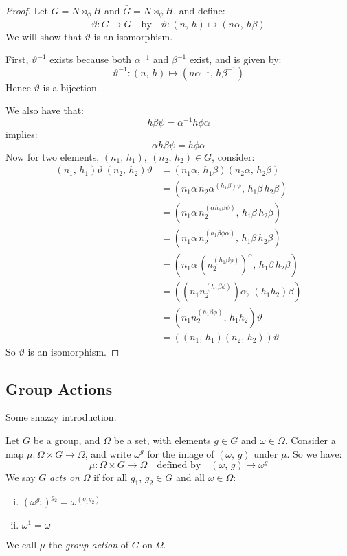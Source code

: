 \begin{proof}
    Let \(G = N \rtimes_\phi H\) and \(\bar{G} = N \rtimes_\psi H\), and define:
    \[\vartheta:G \to \bar{G} \quad \text{by} \quad \vartheta:(n,\,h) \mapsto (n\alpha,\,h\beta)\]
    We will show that \(\vartheta\) is an isomorphism.

    First, \(\vartheta^{-1}\) exists because both \(\alpha^{-1}\) and \(\beta^{-1}\) exist, and is given by:
    \[\vartheta^{-1}:(n,\,h) \mapsto (n\alpha^{-1},\,h\beta^{-1})\]
    Hence \(\vartheta\) is a bijection.

    We also have that:
    \[h\beta\psi = \alpha^{-1}h\phi\alpha\]
    implies:
    \[\alpha h\beta\psi = h\phi\alpha\]
    Now for two elements, \((n_1,\,h_1),\ (n_2,\,h_2) \in G\), consider:
    \begin{equation*}
    \begin{aligned}
        (n_1,\,h_1)\vartheta\ (n_2,\,h_2)\vartheta &= (n_1\alpha,\,h_1\beta)(n_2\alpha,\,h_2\beta) \\
        &= (n_1\alpha\,n_2\alpha^{(h_1\beta)\psi},\,h_1\beta\,h_2\beta) \\
        &= (n_1\alpha\,n_2^{(\alpha h_1\beta\psi)},\,h_1\beta\,h_2\beta) \\
        &= (n_1\alpha\,n_2^{(h_1\beta\phi\alpha)},\, h_1\beta\,h_2\beta) \\
        &= (n_1\alpha\,{(n_2^{(h_1\beta\phi)})}^\alpha,\, h_1\beta\,h_2\beta) \\
        &= ((n_1n_2^{(h_1\beta\phi)})\alpha,\, (h_1h_2)\beta) \\
        &= (n_1n_2^{(h_1\beta\phi)},\, h_1h_2)\vartheta \\
        &= ((n_1,\,h_1)(n_2,\,h_2))\vartheta
    \end{aligned}
    \end{equation*}
    So \(\vartheta\) is an isomorphism.
\end{proof}

\subsection{Group Actions}
Some snazzy introduction.

\begin{definition}
    Let \(G\) be a group, and \(\Omega\) be a set, with elements \(g \in G\) and \(\omega \in \Omega\).
    Consider a map \(\mu:\Omega \times G \to \Omega\), and write \(\omega^g\) for the image of \((\omega,\,g)\) under
    \(\mu\).
    So we have:
    \[\mu:\Omega \times G \to \Omega \quad \text{defined by} \quad (\omega,\,g) \mapsto \omega^g\]
    We say \(G\) \emph{acts on} \(\Omega\) if for all \(g_1,\,g_2 \in G\) and all \(\omega \in \Omega\):
    \begin{enumerate}[(i)]
        \item \({(\omega^{g_1})}^{g_2} = \omega^{(g_1 g_2)}\)
        \item \(\omega^1 = \omega\)
    \end{enumerate}
    We call \(\mu\) the \emph{group action} of \(G\) on \(\Omega\).
\end{definition}


